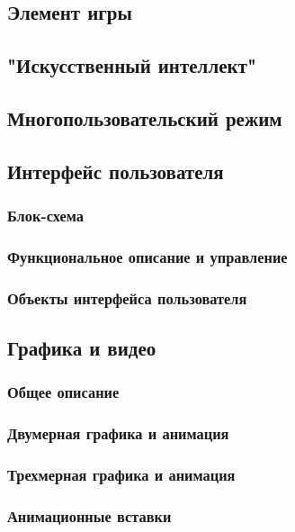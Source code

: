 \documentclass{article}
\begin{document}
\subsection{Элемент игры}

\subsection{"Искусственный интеллект"}

\subsection{Многопользовательский режим}

\subsection{Интерфейс пользователя}

\subsubsection{Блок-схема}
\subsubsection{Функциональное описание и управление}
\subsubsection{Объекты интерфейса пользователя}

\subsection{Графика и видео}

\subsubsection{Общее описание}
\subsubsection{Двумерная графика и анимация}
\subsubsection{Трехмерная графика и анимация}
\subsubsection{Анимационные вставки}
\end{document}
